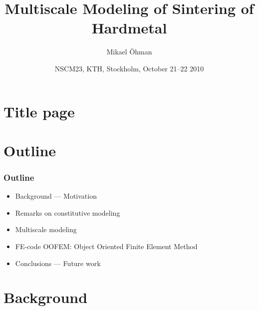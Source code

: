 \documentclass[11pt,mathserif]{beamer}
\title{Multiscale Modeling of Sintering of Hardmetal}
\author{Mikael Öhman}
\institute{Dept. of Applied Mechanics\\ Chalmers University of Technology}
\date{NSCM23, KTH, Stockholm, October 21--22 2010}
\newcommand{\roughcite}[1]{\textsc{#1}}
\begin{document}
\section{Title page}
\begin{frame}[plain]
 \titlepage
\end{frame}

\section{Outline}
\begin{frame}
 \frametitle{Outline}

\begin{itemize}
 \item Background --- Motivation
 \item Remarks on constitutive modeling
 \item Multiscale modeling
 \item FE-code OOFEM: Object Oriented Finite Element Method
 \item Conclusions --- Future work
\end{itemize}
\end{frame}

\section{Background}
% 
% 
\end{document}
